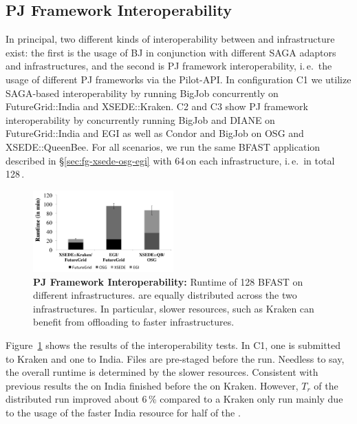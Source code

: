 \documentclass[conference]{IEEEtran}
\begin{document}



\subsection{PJ Framework Interoperability}
\label{sec:experiment-interop}

In principal, two different kinds of interoperability between
\pilotjobs and infrastructure exist: the first is the usage of BJ in
conjunction with different SAGA adaptors and infrastructures, and the
second is PJ framework interoperability, i.\,e.\ the usage of
different PJ frameworks via the Pilot-API. In configuration C1 we
utilize SAGA-based interoperability by running BigJob concurrently on
FutureGrid::India and XSEDE::Kraken. C2 and C3 show PJ
framework interoperability by concurrently running BigJob and DIANE on
FutureGrid::India and EGI as well as Condor and BigJob on OSG and
XSEDE::QueenBee. For all scenarios, we run the same BFAST application
described in \S\ref{sec:fg-xsede-osg-egi} with 64\,\cus on each
infrastructure, i.\,e.\ in total 128\,\cus.

\begin{figure}[htbp]
  	\centering
	\includegraphics[width=0.48\textwidth]{../perf/interop/128-bfast-interop.pdf}
	\caption{\textbf{PJ Framework Interoperability:} Runtime of
          128 BFAST \cus on different infrastructures. \cus are
          equally distributed across the two infrastructures. In
          particular, slower resources, such as Kraken can benefit
          from offloading \cus to faster infrastructures.  }
	\label{fig:perf_interop_128-bfast-interop}
\end{figure}


Figure~\ref{fig:perf_interop_128-bfast-interop} shows the results of the
interoperability tests. In C1, one \pilot is submitted to Kraken and one to
India. Files are pre-staged before the run. Needless to say, the overall runtime
is determined by the slower resources. Consistent with previous results the
\pilot on India finished before the \pilot on Kraken. However, $T_r$ of the
distributed run improved about 6\,\% compared to a Kraken only run mainly due to
the usage of the faster India resource for half of the \cus.
\end{document}
